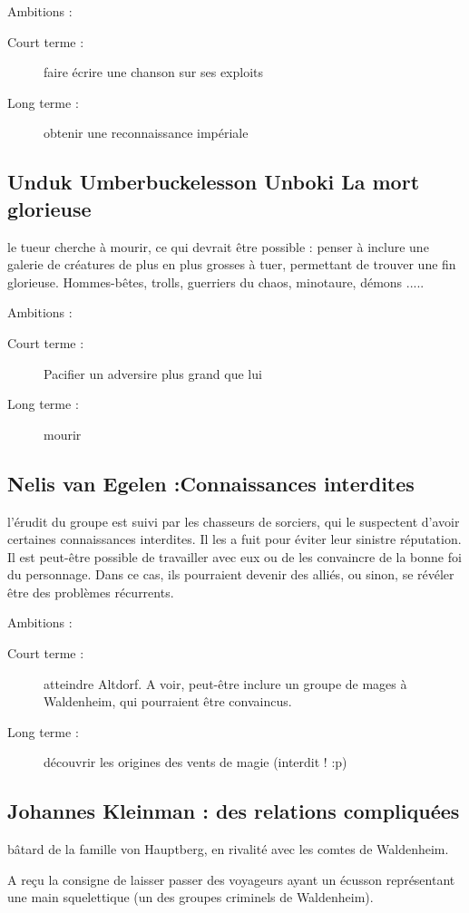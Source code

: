 \documentclass[10pt,a4paper]{book}
\begin{document}
Ambitions :
\begin{description}
\item[Court terme :]faire écrire une chanson sur ses exploits
\item[Long terme :]obtenir une reconnaissance impériale
\end{description}
\subsection{Unduk Umberbuckelesson Unboki La mort glorieuse}
le tueur cherche à mourir, ce qui devrait être possible : penser à inclure une galerie de créatures de plus en plus grosses à tuer, permettant de trouver une fin glorieuse. Hommes-bêtes, trolls, guerriers du chaos, minotaure, démons .....

Ambitions :
\begin{description}
\item[Court terme :]Pacifier un adversire plus grand que lui
\item[Long terme :]mourir
\end{description}
\subsection{Nelis van Egelen :Connaissances interdites}
l'érudit du groupe est suivi par les chasseurs de sorciers, qui le suspectent d'avoir certaines connaissances interdites. Il les a fuit pour éviter leur sinistre réputation. Il est peut-être possible de travailler avec eux ou de les convaincre de la bonne foi du personnage. Dans ce cas, ils pourraient devenir des alliés, ou sinon, se révéler être des problèmes récurrents.

Ambitions :
\begin{description}
\item[Court terme :]atteindre Altdorf. A voir, peut-être inclure un groupe de mages à Waldenheim, qui pourraient être convaincus.
\item[Long terme :]découvrir les origines des vents de magie (interdit ! :p)
\end{description}
\subsection{Johannes Kleinman : des relations compliquées}
bâtard de la famille von Hauptberg, en rivalité avec les comtes de Waldenheim.

A reçu la consigne de laisser passer des voyageurs ayant un écusson représentant une main squelettique (un des groupes criminels de Waldenheim).
\end{document}
